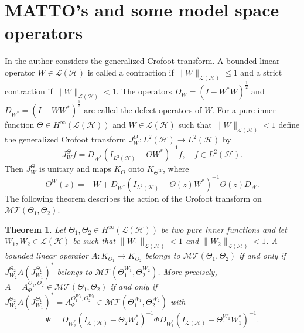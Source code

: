 \documentclass[11pt]{amsart}
\numberwithin{equation}{section}
\newcommand{\hsp}{\mathcal{H}}
\newcommand{\oL }{\mathcal{L}(\hsp) }
\newtheorem{theorem}{Theorem}[section]
\theoremstyle{definition}
\numberwithin{equation}{section}
\begin{document}
\section{MATTO's and some model space operators}\label{s4}
In \cite{RK} the author considers the generalized Crofoot transform. A bounded linear operator $W\in \oL$ is called $\text{a}$ contraction if $\|W\|_{\oL}\leq 1$ and $\text{a}$ strict contraction if $\|W\|_{\oL} < 1$. The operators $D_{W}=(I-W^{*}W)^{\frac{1}{2}}$ and $D_{W^{*}}=(I-WW^{*})^{\frac{1}{2}}$ are called the defect operators of $W$. For a pure inner function $\Theta\in H^{\infty}(\oL )$ and $W\in \oL $ such that $\|W\|_{\oL}<1$ define the generalized Crofoot transform $J_{W}^{\Theta}: L^2(\hsp)\to L^2(\hsp )$ by
$$J_{W}^{\Theta}f=D_{W^{*}}(I_{L^2(\hsp)}-\Theta W^{*})^{-1}f,\quad f\in L^2(\hsp). $$
Then $J_{W}^{\Theta}$ is unitary and maps $K_{\Theta}$ onto $K_{\Theta^{W}}$, where
$$\Theta^{W}(z)=-W+D_{W^{*}}(I_{L^2(\hsp)}-\Theta(z) W^{*})^{-1}\Theta(z) D_{W}.$$
The following theorem describes the action of the Crofoot transform on $\mathcal{MT}(\Theta_{1}, \Theta_{2})$.
\begin{theorem}{\em\cite{RK2}}
	Let $\Theta_{1},\Theta_{2}\in H^{\infty}(\oL)$ be two pure inner functions and let $W_1,W_2\in \oL$ be such that $\|W_1\|_{\oL}<1$ and $\|W_2\|_{\oL}<1$. A bounded linear operator $A:K_{\Theta_1}\to K_{\Theta_2}$ belongs to $\mathcal{MT}(\Theta_{1}, \Theta_{2})$ if and only if $J_{W_{2}}^{\Theta_2}A(J_{W_{1}}^{\Theta_1})^{*}$ belongs to $\mathcal{MT}(\Theta_{1}^{W_1}, \Theta_{2}^{W_2})$. More precisely, $A=A_{\Phi}^{\Theta_{1}, \Theta_{2}}\in \mathcal{MT}(\Theta_{1}, \Theta_{2})$ if and only if $J_{W_{2}}^{\Theta_2}A(J_{W_{1}}^{\Theta_1})^{*}=A_{\Psi}^{\Theta_{1}^{W_1}, \Theta_{2}^{W_2}}\in\mathcal{MT}(\Theta_{1}^{W_1}, \Theta_{2}^{W_2})$ with
	\begin{equation*}
	\Psi = D_{W_{2}^{*}}(I_{\oL}-\Theta_{2}W_{2}^{*})^{-1}\Phi D_{W_{1}^{*}}(I_{\oL}+\Theta^{W_1}_{1} W_{1}^{*})^{-1}.
	\end{equation*}
\end{theorem}
\end{document}
